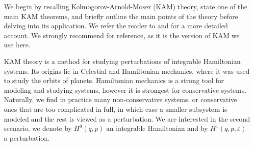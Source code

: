 
We begin by recalling Kolmogorov-Arnold-Moser (KAM) theory, state one of the main KAM theorems, and briefly outline the main points of the theory before delving into its application. We refer the reader to \cite{Knauf_2018} and \cite{Seri_2022} for a more detailed account. We strongly recommend \cite{poschel82} for reference, as it is the version of KAM we use here. 

KAM theory is a method for studying perturbations of integrable Hamiltonian systems. Its origins lie in Celestial and Hamiltonian mechanics, where it was used to study the orbits of planets. Hamiltonian mechanics is a strong tool for modeling and studying systems, however it is strongest for conservative systems. Naturally, we find in practice many non-conservative systems, or conservative ones that are too complicated in full, in which case a smaller subsystem is modeled and the rest is viewed as a perturbation. We are interested in the second scenario, we denote by $H^0(q,p)$ an integrable Hamiltonian and by $H^1(q,p,\varepsilon)$ a perturbation. 

